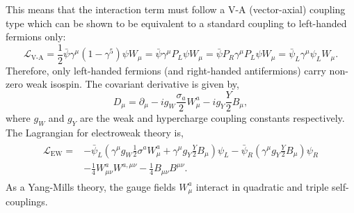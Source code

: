 This means that the interaction term must follow a V-A (vector-axial) coupling type which can be shown to be equivalent to a standard coupling to left-handed fermions only:
\begin{equation}
    \label{eq:v-a_coupling}
    \mathcal{L}_\text{V-A}
    = \frac{1}{2} \bar \psi \gamma^\mu (1 - \gamma^5) \psi W_\mu
    = \bar \psi \gamma^\mu P_L \psi W_\mu
    = \bar \psi P_R \gamma^\mu P_L \psi W_\mu
    = \bar \psi_L \gamma^\mu \psi_L W_\mu.
\end{equation}
Therefore, only left-handed fermions (and right-handed antifermions) carry non-zero weak isospin.
The covariant derivative is given by,
\begin{equation}
    \label{eq:ew_covariant_derivative}
    D_\mu = \partial_\mu - i g_W \frac{\sigma_a}{2} W_\mu^a - i g_Y \frac{Y}{2} B_\mu,
\end{equation}
where $g_W$ and $g_Y$ are the weak and hypercharge coupling constants respectively.
The Lagrangian for electroweak theory is,
\begin{align}
    \begin{split}
        \label{eq:ew_lagrangian}
        \mathcal{L}_\text{EW} = & - \bar{\psi}_L \left( \gamma^\mu g_W \frac{1}{2} \sigma^a W^a_\mu + \gamma^\mu g_Y \frac{Y}{2} B_\mu \right) \psi_L - \bar{\psi}_R \left( \gamma^\mu g_Y \frac{Y}{2} B_\mu \right) \psi_R \\
                                & - \frac{1}{4} W_{\mu\nu}^a W^{a,\mu\nu} - \frac{1}{4} B_{\mu\nu} B^{\mu\nu}.
    \end{split}
\end{align}
As a Yang-Mills theory, the gauge fields $W_\mu^a$ interact in quadratic and triple self-couplings.

